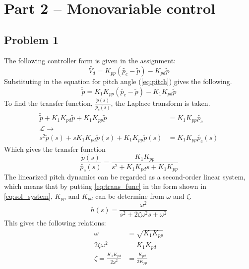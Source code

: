 
\section{Part 2 -- Monovariable control}
%
\subsection{Problem 1}
The following controller form is given in the assignment\cite[p.15]{assignment}:
%
\begin{equation}
  \label{eq:pd_controller}
  \tilde{V_d} = K_{pp}(\tilde{p_c} - \tilde{p}) - K_{pd} \dot{\tilde{p}}
\end {equation}
%
Substituting in the equation for pitch
angle (\cref{eq:pitch}) gives the following.
%
\begin{equation}
  \label{eq:pitch_with_pd}
  \ddot{\tilde{p}} = K_1 K_{pp}(\tilde{p_c} - \tilde{p}) - K_1 K_{pd}
  \dot{\tilde{p}}
\end{equation}
%
To find the transfer
function, $\frac{\tilde{p}(s)}{\tilde{p_c}(s)}$, the Laplace transform
is taken.
%
\begin{align*}
  \ddot{\tilde{p}} + K_1 K_{pd}\dot{\tilde{p}}
  + K_1K_{pp}\tilde{p} &= K_1 K_{pp}\tilde{p_c} \\
  \mathcal{L}\rightarrow&  \\
  s^2\tilde{p}(s) + sK_1K_{pd}\tilde{p}(s)
  + K_1K_{pp}\tilde{p}(s) &= K_1K_{pp}\tilde{p_c}(s)
\end{align*}
%
Which gives the transfer function
%
\begin{equation}
  \label{eq:trans_func}
  \frac{\tilde{p}(s)}{\tilde{p_c}(s)} =
  \frac{K_1K_{pp}}{s^2+K_1K_{pd}s+K_1K_{pp}}
\end{equation}
%
The linearized pitch dynamics can be regarded as a second-order linear
system, which means that by putting \cref{eq:trans_func} in the form
shown in \cref{eq:sol_system}, $K_{pp}$ and $K_{pd}$ can be determine
from $\omega$ and $\zeta$.
%
\begin{equation}
  \label{eq:sol_system}
  h(s) = \frac{\omega^2}{s^2+2\zeta\omega^2s+\omega^2}
\end{equation}
%
This gives the following relations:
%
\begin{align}
  \label{eq:omega}
  \omega &= \sqrt{K_ 1K_ {pp}} \\
  2\zeta\omega^2 &= K_ 1K_ {pd} \nonumber \\
  \label{eq:zeta}
  \zeta = \frac{K_ 1K_ {pd}}{2\omega^2} &= \frac{K_{pd}}{2K_{pp}}
\end{align}
